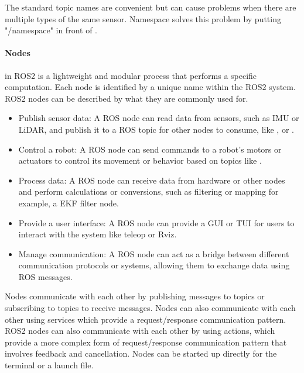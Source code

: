 The standard topic names are convenient but can cause problems when there are multiple types of the same sensor. Namespace solves this problem by putting "/namespace" in front of .  

\paragraph{Nodes} in ROS2 is a lightweight and modular process that performs a specific computation. Each node is identified by a unique name within the ROS2 system. 
ROS2 nodes can be described by what they are commonly used for. 

\begin{itemize}
    \item Publish sensor data: A ROS node can read data from sensors, such as IMU or LiDAR, and publish it to a ROS topic for other nodes to consume, like ,  or .
    
    \item Control a robot: A ROS node can send commands to a robot's motors or actuators to control its movement or behavior based on topics like .
    
    \item Process data: A ROS node can receive data from hardware or other nodes and perform calculations or conversions, such as filtering or mapping for example, a EKF filter node.
    
    \item Provide a user interface: A ROS node can provide a GUI or TUI for users to interact with the system like teleop or Rviz.
    
    \item Manage communication: A ROS node can act as a bridge between different communication protocols or systems, allowing them to exchange data using ROS messages.
    
\end{itemize}

Nodes communicate with each other by publishing messages to topics or subscribing to topics to receive messages. Nodes can also communicate with each other using services which provide a request/response communication pattern. ROS2 nodes can also communicate with each other by using actions, which provide a more complex form of request/response communication pattern that involves feedback and cancellation. Nodes can be started up directly for the terminal or a launch file. 


